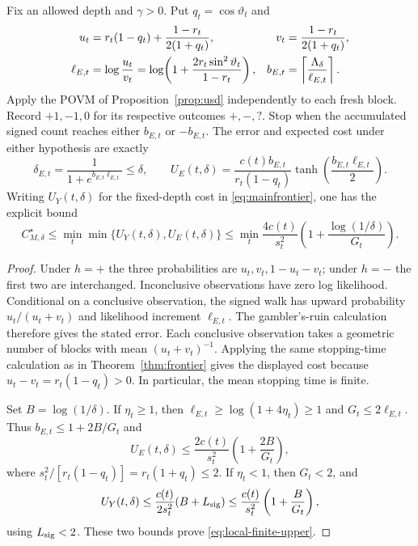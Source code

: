 \begin{proposition}
\label{prop:conclusive-counting}
Fix an allowed depth and $\gamma>0$. Put $q_t=\cos\vartheta_t$ and
\begin{align}
 u_t&=r_t(1-q_t)+\frac{1-r_t}{2(1+q_t)},&
 v_t&=\frac{1-r_t}{2(1+q_t)},\notag\\
 \ell_{E,t}&=\log\frac{u_t}{v_t}
 =\log\!\left(1+\frac{2r_t\sin^2\vartheta_t}{1-r_t}\right),&
 b_{E,t}&=\left\lceil\frac{\Lambda_\delta}{\ell_{E,t}}\right\rceil.
 \label{eq:conclusive-increments}
\end{align}
Apply the POVM of Proposition~\ref{prop:usd} independently to each fresh
block. Record $+1,-1,0$ for its respective outcomes $+,-,?$. Stop when
the accumulated signed count reaches either $b_{E,t}$ or $-b_{E,t}$.
The error and expected cost under either hypothesis are exactly
\begin{equation}\label{eq:conclusive-counting}
 \delta_{E,t}=\frac1{1+e^{b_{E,t}\ell_{E,t}}}\leq\delta,
 \qquad
 U_E(t,\delta)=
 \frac{c(t)b_{E,t}}{r_t(1-q_t)}
       \tanh\!\left(\frac{b_{E,t}\ell_{E,t}}2\right).
\end{equation}
Writing $U_Y(t,\delta)$ for the fixed-depth cost in
\eqref{eq:mainfrontier}, one has the explicit bound
\begin{equation}\label{eq:local-finite-upper}
 C_{M,\delta}^\star
 \leq\min_t\min\{U_Y(t,\delta),U_E(t,\delta)\}
 \leq\min_t\frac{4c(t)}{s_t^2}
              \left(1+\frac{\log(1/\delta)}{G_t}\right).
\end{equation}
\end{proposition}
\begin{proof}
Under $h=+$ the three probabilities are $u_t,v_t,1-u_t-v_t$; under
$h=-$ the first two are interchanged. Inconclusive observations have
zero log likelihood. Conditional on a conclusive observation, the signed
walk has upward probability $u_t/(u_t+v_t)$ and likelihood increment
$\ell_{E,t}$. The gambler's-ruin calculation therefore gives the stated
error. Each conclusive observation takes a geometric number of blocks
with mean $(u_t+v_t)^{-1}$. Applying the same stopping-time calculation
as in Theorem~\ref{thm:frontier} gives the displayed cost because
$u_t-v_t=r_t(1-q_t)>0$. In particular, the mean stopping time is finite.

Set $B=\log(1/\delta)$. If $\eta_t\geq1$, then
$\ell_{E,t}\geq\log(1+4\eta_t)\geq1$ and
$G_t\leq2\ell_{E,t}$. Thus $b_{E,t}\leq1+2B/G_t$ and
\[
 U_E(t,\delta)\leq\frac{2c(t)}{s_t^2}
                  \left(1+\frac{2B}{G_t}\right),
\]
where $s_t^2/[r_t(1-q_t)]=r_t(1+q_t)\leq2$.
If $\eta_t<1$, then $G_t<2$, and
\[
 U_Y(t,\delta)\leq\frac{c(t)}{2s_t^2}(B+L_{\rm sig})
 \leq\frac{c(t)}{s_t^2}\left(1+\frac{B}{G_t}\right),
\]
using $L_{\rm sig}<2$. These two bounds prove
\eqref{eq:local-finite-upper}.
\end{proof}

